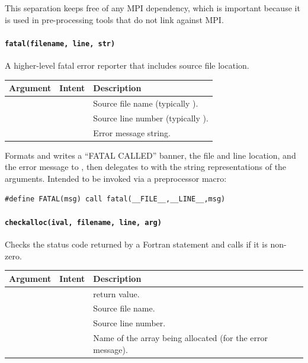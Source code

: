 This separation keeps  free of any MPI dependency,
which is important because it is used in pre-processing tools that do not
link against MPI.

\paragraph{\texttt{fatal(filename, line, str)}}

A higher-level fatal error reporter that includes source file location.

\begin{longtable}{L{3cm} L{3cm} L{8cm}}
  \toprule
  \textbf{Argument} & \textbf{Intent} & \textbf{Description} \\
  \midrule
  \endhead
  \bottomrule
  \endfoot
   &  & Source file name (typically ). \\
       &  & Source line number (typically ). \\
        &  & Error message string. \\
\end{longtable}

Formats and writes a ``FATAL CALLED'' banner, the file and line location, and
the error message to , then delegates to  with the
string representations of the arguments. Intended to be invoked via a
preprocessor macro:

\begin{lstlisting}
#define FATAL(msg) call fatal(__FILE__,__LINE__,msg)
\end{lstlisting}

\paragraph{\texttt{checkalloc(ival, filename, line, arg)}}

Checks the status code  returned by a Fortran 
statement and calls  if it is non-zero.

\begin{longtable}{L{3cm} L{3cm} L{8cm}}
  \toprule
  \textbf{Argument} & \textbf{Intent} & \textbf{Description} \\
  \midrule
  \endhead
  \bottomrule
  \endfoot
       &  &   return value. \\
   &  & Source file name. \\
       &  & Source line number. \\
        &  & Name of the array being allocated (for
    the error message). \\
\end{longtable}

